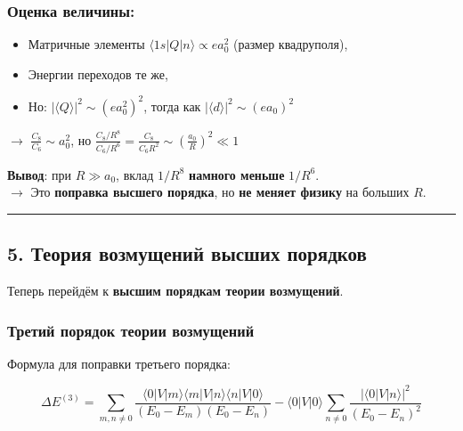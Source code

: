 \documentclass[11pt]{article}
\providecommand{\tightlist}{%
      \setlength{\itemsep}{0pt}\setlength{\parskip}{0pt}}
\begin{document}
\subsubsection{Оценка
величины:}\label{ux43eux446ux435ux43dux43aux430-ux432ux435ux43bux438ux447ux438ux43dux44b}

\begin{itemize}
\tightlist
\item
  Матричные элементы \(\langle 1s| Q |n \rangle \propto e a_0^2\)
  (размер квадруполя),
\item
  Энергии переходов те же,
\item
  Но: \(|\langle Q \rangle|^2 \sim (e a_0^2)^2\), тогда как
  \(|\langle d \rangle|^2 \sim (e a_0)^2\)
\end{itemize}

$\rightarrow$ \(\frac{C_8}{C_6} \sim a_0^2\), но
\(\frac{C_8 / R^8}{C_6 / R^6} = \frac{C_8}{C_6 R^2} \sim \left( \frac{a_0}{R} \right)^2 \ll 1\)

\textbf{Вывод}: при \(R \gg a_0\), вклад \(1/R^8\) \textbf{намного
меньше} \(1/R^6\).\\
$\rightarrow$ Это \textbf{поправка высшего порядка}, но \textbf{не
меняет физику} на больших \(R\).

\begin{center}\rule{0.5\linewidth}{\linethickness}\end{center}

\subsection{5. Теория возмущений высших
порядков}\label{ux442ux435ux43eux440ux438ux44f-ux432ux43eux437ux43cux443ux449ux435ux43dux438ux439-ux432ux44bux441ux448ux438ux445-ux43fux43eux440ux44fux434ux43aux43eux432}

Теперь перейдём к \textbf{высшим порядкам теории возмущений}.

\subsubsection{Третий порядок теории
возмущений}\label{ux442ux440ux435ux442ux438ux439-ux43fux43eux440ux44fux434ux43eux43a-ux442ux435ux43eux440ux438ux438-ux432ux43eux437ux43cux443ux449ux435ux43dux438ux439}

Формула для поправки третьего порядка:

\[
\Delta E^{(3)} = \sum_{m,n \neq 0} \frac{ \langle 0| V |m\rangle \langle m| V |n\rangle \langle n| V |0\rangle }{ (E_0 - E_m)(E_0 - E_n) } - \langle 0| V |0\rangle \sum_{n \neq 0} \frac{ |\langle 0| V |n\rangle|^2 }{ (E_0 - E_n)^2 }
\]
\end{document}
